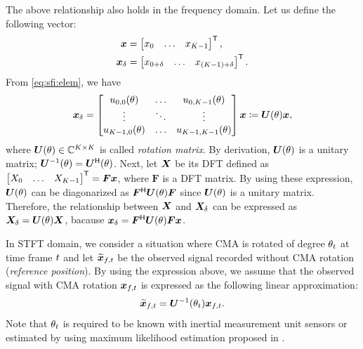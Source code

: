 \documentclass[sip,biber]{now-journal}
\begin{document}
The above relationship also holds in the frequency domain.
Let us define the following vector:
\begin{align}
  \bm{x} &= \begin{bmatrix} x _{0} & \dots & x _{K - 1} \end{bmatrix} ^{\mathsf{T}}, \\
  \bm{x} _{\delta} &= \begin{bmatrix} x _{0+\delta} & \dots & x _{(K - 1)+\delta} \end{bmatrix} ^{\mathsf{T}}.
\end{align}
From \eqref{eq:sfi:elem}, we have
\begin{equation}
  \bm{x} _{\delta}
  =
  \begin{bmatrix}
    u _{0, 0}(\theta) & \dots & u _{0, K - 1}(\theta) \\
    \vdots & \ddots & \vdots \\
    u _{K - 1, 0}(\theta) & \dots & u _{K - 1, K - 1}(\theta)
  \end{bmatrix}
  \bm{x}
  \coloneqq
  \bm{U} (\theta) \bm{x},
  \label{eq:rotmat}
\end{equation}
where $\bm{U} (\theta) \in \mathbb{C} ^{K\times K}$ is called \emph{rotation matrix}.
By derivation, $\bm{U} (\theta)$ is a unitary matrix; $\bm{U} ^{-1} (\theta) = \bm{U} ^{\mathsf{H}} (\theta)$.
Next, let $\bm{X}$ be its DFT defined as $\begin{bmatrix} X _{0} & \dots & X _{K - 1}\end{bmatrix} ^{\mathsf{T}} = \bm{F} \bm{x}$, where $\bm{F}$ is a DFT matrix.
By using these expression, $\bm{U} (\theta)$ can be diagonarized as $\bm{F}^{\mathsf{H}} \bm{U} (\theta) \bm{F}$ since $\bm{U} (\theta)$ is a unitary matrix.
Therefore, the relationship between $\bm{X}$ and $\bm{X} _{\delta}$ can be expressed as $\bm{X} _{\delta} = \bm{U} (\theta) \bm{X}$,
bacause $\bm{x} _{\delta} = \bm{F}^{\mathsf{H}} \bm{U} (\theta) \bm{F} \bm{x}$.

In STFT domain, we consider a situation where CMA is rotated of degree $\theta _{t}$ at time frame $t$ and let $\refpos{\Obs} _{\ft}$ be the observed signal recorded without CMA rotation (\emph{reference position}).
By using the expression above, we assume that the observed signal with CMA rotation $\Obs _{\ft}$ is expressed as the following linear approximation:
\begin{equation}
  \refpos{\Obs} _{\ft} = \rotMat ^{-1} (\rotSpat _{\tframe}) \Obs _{\ft}.
\end{equation}
Note that $\theta _{t}$ is required to be known with inertial measurement unit sensors or estimated by using maximum likelihood estimation proposed in \cite{Lian:2021:APSIPA}.
\end{document}

